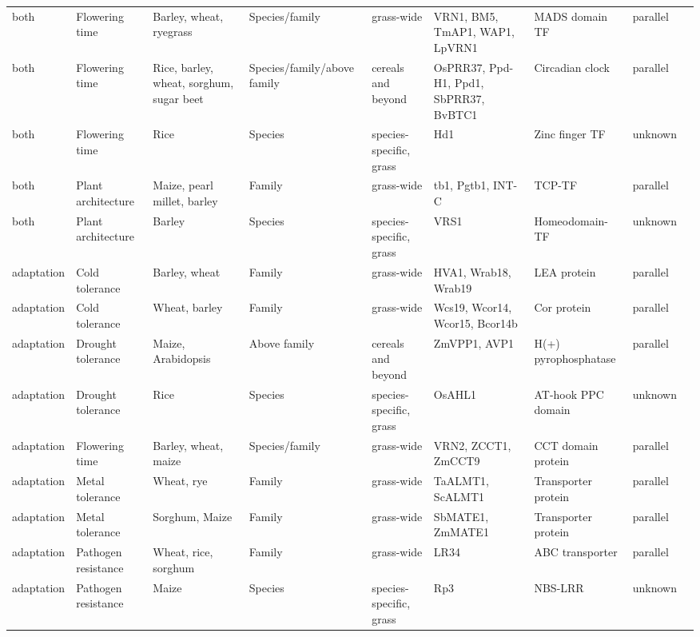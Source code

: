 \documentclass[12pt]{article}
\begin{document}
\begin{table}
\begin{center}
\begin{tabular}{C{1.5cm}G{2.5cm}C{3.10cm}C{3.2cm}C{2.3cm}G{3.5cm}G{2.1cm}C{1.3cm}G{1.5cm}}
 both & Flowering time &Barley, wheat, ryegrass & Species/family & grass-wide & VRN1, BM5, TmAP1, WAP1, LpVRN1 & MADS domain TF & parallel & \citep{Asp2011}\\
 both & Flowering time &Rice, barley, wheat, sorghum, sugar beet & Species/family/above family & cereals and beyond & OsPRR37, Ppd-H1, Ppd1, SbPRR37, BvBTC1 & Circadian clock& parallel & \citep{MURAKAMI2005, Turner2005, Jones2008, Beales2007, Wilhelm2008, Daz2012}\\
 both & Flowering time &Rice & Species & species-specific, grass & Hd1 & Zinc finger TF & unknown & \citep{Martin2013}\\
 both & Plant architecture &Maize, pearl millet, barley & Family & grass-wide & tb1, Pgtb1, INT-C & TCP-TF & parallel & \citep{Studer2011, Remigereau2011, Ramsay2011}\\
 both & Plant architecture &Barley & Species & species-specific, grass & VRS1 & Homeodomain-TF & unknown & \citep{Martin2013}\\
 adaptation & Cold tolerance &Barley, wheat & Family & grass-wide & HVA1, Wrab18, Wrab19 & LEA protein & parallel & \citep{Hong1988, pmid16755132}\\
 adaptation & Cold tolerance &Wheat, barley & Family & grass-wide & Wcs19, Wcor14, Wcor15, Bcor14b & Cor protein & parallel & \citep{Takumi2003}\\
 adaptation & Drought tolerance &Maize, Arabidopsis & Above family & cereals and beyond & ZmVPP1, AVP1 & H(+) pyrophosphatase & parallel & \citep{Wang2016}\\
 adaptation & Drought tolerance &Rice & Species & species-specific, grass & OsAHL1 & AT-hook PPC domain & unknown & \citep{Zhou2016}\\
 adaptation & Flowering time &Barley, wheat, maize & Species/family & grass-wide & VRN2, ZCCT1, ZmCCT9 & CCT domain protein& parallel & \citep{Huang2017}\\
 adaptation & Metal tolerance &Wheat, rye & Family & grass-wide & TaALMT1, ScALMT1 & Transporter protein & parallel & \citep{Martin2013}\\
 adaptation & Metal tolerance &Sorghum, Maize & Family & grass-wide & SbMATE1, ZmMATE1 & Transporter protein & parallel & \citep{Martin2013}\\
 adaptation & Pathogen resistance &Wheat, rice, sorghum & Family & grass-wide & LR34 & ABC transporter & parallel & \citep{Krattinger2010}\\
 adaptation & Pathogen resistance &Maize & Species & species-specific, grass & Rp3 & NBS-LRR & unknown & \citep{pmid12242248}\\

\end{tabular}
\end{center}
\end{table}
\end{document}
